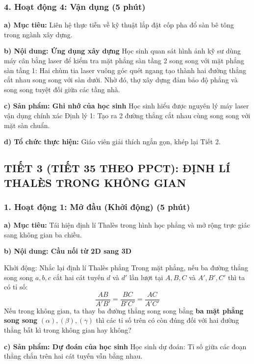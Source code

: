 \documentclass[12pt, a4paper]{article}
\begin{document}
\subsubsection*{4. Hoạt động 4: Vận dụng (5 phút)}

\noindent \textbf{a) Mục tiêu:}
Liên hệ thực tiễn về kỹ thuật lắp đặt cốp pha đổ sàn bê tông trong ngành xây dựng.

\noindent \textbf{b) Nội dung: Ứng dụng xây dựng}
Học sinh quan sát hình ảnh kỹ sư dùng máy cân bằng laser để kiểm tra mặt phẳng sàn tầng 2 song song với mặt phẳng sàn tầng 1: Hai chùm tia laser vuông góc quét ngang tạo thành hai đường thẳng cắt nhau song song với sàn dưới. Nhờ đó, thợ xây dựng đảm bảo độ phẳng và song song tuyệt đối giữa các tầng nhà.

\noindent \textbf{c) Sản phẩm: Ghi nhớ của học sinh}
Học sinh hiểu được nguyên lý máy laser vận dụng chính xác Định lý 1: Tạo ra 2 đường thẳng cắt nhau cùng song song với mặt sàn chuẩn.

\noindent \textbf{d) Tổ chức thực hiện:}
Giáo viên giải thích ngắn gọn, khép lại Tiết 2.

\subsection*{TIẾT 3 (TIẾT 35 THEO PPCT): ĐỊNH LÍ THALÈS TRONG KHÔNG GIAN}

\subsubsection*{1. Hoạt động 1: Mở đầu (Khởi động) (5 phút)}

\noindent \textbf{a) Mục tiêu:}
Tái hiện định lí Thalès trong hình học phẳng và mở rộng trực giác sang không gian ba chiều.

\noindent \textbf{b) Nội dung: Cầu nối từ 2D sang 3D}
\begin{pedabox}{Khởi động: Nhắc lại định lí Thalès phẳng}
Trong mặt phẳng, nếu ba đường thẳng song song $a, b, c$ cắt hai cát tuyến $d$ và $d'$ lần lượt tại $A, B, C$ và $A', B', C'$ thì ta có tỉ số:
$$\dfrac{AB}{A'B'} = \dfrac{BC}{B'C'} = \dfrac{AC}{A'C'}$$
Nếu trong không gian, ta thay ba đường thẳng song song bằng \textbf{ba mặt phẳng song song} $(\alpha), (\beta), (\gamma)$ thì các tỉ số trên có còn đúng đối với hai đường thẳng bất kì trong không gian hay không?
\end{pedabox}

\noindent \textbf{c) Sản phẩm: Dự đoán của học sinh}
Học sinh dự đoán: Tỉ số giữa các đoạn thẳng chắn trên hai cát tuyến vẫn bằng nhau.
\end{document}
